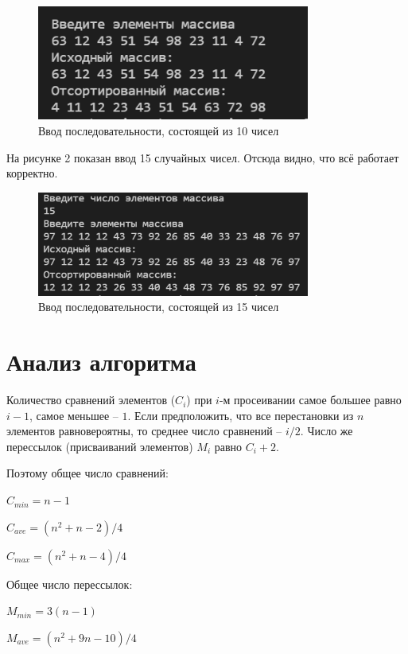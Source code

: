 \documentclass[bachelor, och, labwork]{shiza}
\begin{document}
  \begin{figure}[H]
    \centering
    \includegraphics[width=0.8\textwidth]{img/1_1}
    \caption{Ввод последовательности, состоящей из 10 чисел}
  \end{figure}

  На рисунке 2 показан ввод 15 случайных чисел. Отсюда видно, что всё работает корректно.

  \begin{figure}[H]
    \centering
    \includegraphics[width=0.8\textwidth]{img/1_2}
    \caption{Ввод последовательности, состоящей из 15 чисел}
  \end{figure}
  
  \section{Анализ алгоритма}

  Количество сравнений элементов ($C_i$) при $i$-м просеивании самое большее равно $i-1$, самое меньшее -- $1$. Если предположить,
  что все перестановки из $n$ элементов равновероятны, то среднее число сравнений -- $i/2$. Число же перессылок (присваиваний
  элементов) $M_i$ равно $C_i+2$. 
  
  Поэтому общее число сравнений:

    $C_{min} = n - 1$
    
    $C_{ave} = (n^2 + n - 2) / 4$

    $C_{max} = (n^2 + n - 4) / 4$

  Общее число перессылок:

    $M_{min} = 3(n - 1)$
    
    $M_{ave} = (n^2 + 9n - 10) / 4$
\end{document}
